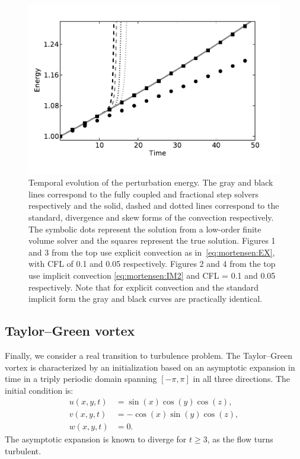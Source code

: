\begin{figure}
  \includegraphics[width=\twofigs]{chapters/mortensen/pdf/OS_energy_cfl_0_05_model_0.pdf}
  \caption{Temporal evolution of the perturbation energy. The gray and
    black lines correspond to the fully coupled and fractional step
    solvers respectively and the solid, dashed and dotted lines
    correspond to the standard, divergence and skew forms of the
    convection respectively. The symbolic dots represent the solution
    from a low-order finite volume solver and the squares represent the
    true solution. Figures 1 and 3 from the top use explicit convection
    as in~\eqref{eq:mortensen:EX}, with CFL of 0.1 and 0.05 respectively.
    Figures 2 and 4 from the top use implicit convection \eqref{eq:mortensen:IM2} and CFL =
    0.1 and 0.05 respectively. Note that for explicit convection and the standard
    implicit form the gray and black curves are practically
    identical. }
\label{fig:mortensen:OS_long_time}
\end{figure}


\subsection{Taylor--Green vortex}
\label{sec:mortensen:TG}

Finally, we consider a real transition to turbulence problem. The
Taylor--Green vortex is characterized by an initialization based on
an asymptotic expansion in time in a triply periodic domain spanning
$[-\pi,\pi]$ in all three directions. The initial condition is:
\begin{align}
 u(x,y,t)&=\sin(x)\cos(y)\cos(z),
\\
 v(x,y,t)&=-\cos(x)\sin(y)\cos(z),
\\
 w(x,y,t)&=0.
\end{align}
The asymptotic expansion is known to diverge for $t \ge 3$, as the flow
turns turbulent.

